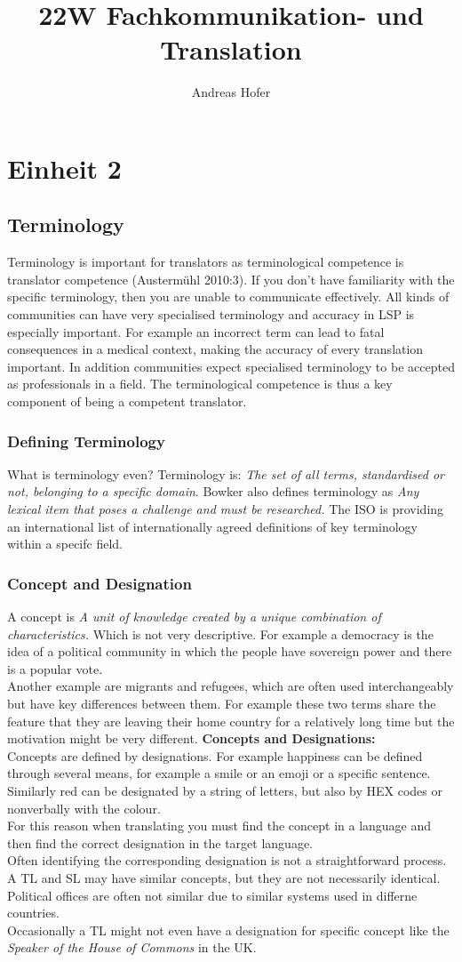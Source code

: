 \documentclass{article}
\title{\vspace{-3cm}22W Fachkommunikation- und Translation}
\author{Andreas Hofer}
\begin{document}
	\section{Einheit 2}
	\subsection{Terminology}
	Terminology is important for translators as terminological competence is translator competence (Austermühl 2010:3). If you don't have familiarity with the specific terminology, then you are unable to communicate effectively. All kinds of communities can have very specialised terminology and accuracy in LSP is especially important. For example an incorrect term can lead to fatal consequences in a medical context, making the accuracy of every translation important. In addition communities expect specialised terminology to be accepted as professionals in a field. The terminological competence is thus a key component of being a competent translator.
	\subsubsection{Defining Terminology}
	What is terminology even? Terminology is: \textit{The set of all terms, standardised or not, belonging to a specific domain}. Bowker also defines terminology as \textit{Any lexical item that poses a challenge and must be researched.}
	The ISO is providing an international list of internationally agreed definitions of key terminology within a specifc field.
	\subsubsection{Concept and Designation}
	A concept is \textit{A unit of knowledge created by a unique combination of characteristics.} Which is not very descriptive. For example a democracy is the idea of a political community in which the people have sovereign power and there is a popular vote. \\
	Another example are migrants and refugees, which are often used interchangeably but have key differences between them.
	For example these two terms share the feature that they are leaving their home country for a relatively long time but the motivation might be very different.
	\textbf{Concepts and Designations:} \\
	Concepts are defined by designations. For example happiness can be defined through several means, for example a smile or an emoji or a specific sentence. Similarly red can be designated by a string of letters, but also by HEX codes or nonverbally with the colour. \\
	For this reason when translating you must find the concept in a language and then find the correct designation in the target language. \\
	Often identifying the corresponding designation is not a straightforward process. A TL and SL may have similar concepts, but they are not necessarily identical. Political offices are often not similar due to similar systems used in differne countries. \\
	Occasionally a TL might not even have a designation for specific concept like the \textit{Speaker of the House of Commons} in the UK.
\end{document}
